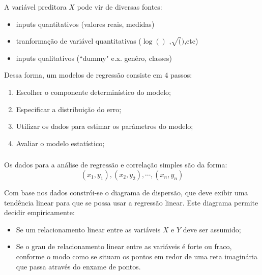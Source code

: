 \documentclass[14pt,aspectratio=1610]{beamer}
\begin{document}
\begin{frame}{}
\frametitle{ }
\begin{block}{}
\justifying
A variável preditora $X$ pode vir de diversas fontes:
\begin{itemize}
\item inputs quantitativos (valores reais, medidas)
\item tranformação de variável quantitativas ($\log()$ ,$\sqrt()$,etc)
\item inputs qualitativos (``dummy" e.x. genêro, classes)
\end{itemize}
Dessa forma, um modelos de regressão consiste em 4 passos:
\begin{enumerate}
\item Escolher o componente determinístico do modelo;\pause
\item Especificar a distribuição do erro;\pause
\item Utilizar os dados para estimar os parâmetros do modelo;\pause
\item Avaliar o modelo estatístico;
\end{enumerate}
\end{block}
\end{frame}


\begin{frame}{}
\frametitle{ }
\begin{block}{}
\justifying
Os dados para a análise de regressão e correlação simples são da forma:
$$(x_{1},y_{1}),(x_{2},y_{2}),\cdots, (x_{n},y_{n})$$

Com base nos dados constrói-se o diagrama de dispersão, que deve exibir
uma tendência linear para que se possa usar a regressão linear.
Este diagrama permite decidir empiricamente:
\begin{itemize}
\item Se um relacionamento linear entre as variáveis $X$ e $Y$ deve ser assumido;
\item Se o grau de relacionamento linear entre as variáveis é forte ou fraco,
conforme o modo como se situam os pontos em redor de uma reta imaginária que passa através do enxame de pontos.
\end{itemize}
\end{block}
\end{frame}
\end{document}
